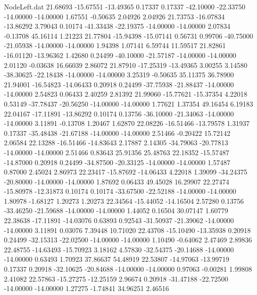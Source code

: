 \begin{filecontents}{NodeLeft.dat}
  21.68693  -15.67551  -13.49365     0.17337    0.17337  -42.10000  -22.33750  -14.00000  -14.00000    1.67551   -0.50635    2.04926    2.04926
  21.73753  -16.07834  -13.86292     3.79043    0.10174  -41.33438  -22.19375  -14.00000  -14.00000    2.07834   -0.13708   45.16114    1.21223
  21.77804  -15.94398  -15.07141     0.56731    0.99706  -40.75000  -21.05938  -14.00000  -14.00000    1.94398    1.07141    6.59744   11.59517
  21.82861  -16.01120  -13.96362     1.42680    0.24499  -40.10000  -21.57187  -14.00000  -14.00000    2.01120   -0.03638   16.66039    2.86072
  21.87910  -17.25319  -13.49365     3.00255    3.14580  -38.30625  -22.18438  -14.00000  -14.00000    3.25319   -0.50635   35.11375   36.78900
  21.94001  -16.54823  -14.06433     0.20918    0.24499  -37.75938  -21.88437  -14.00000  -14.00000    2.54823    0.06433    2.40259    2.81392
  21.99060  -15.77621  -15.37354     4.22018    0.53149  -37.78437  -20.56250  -14.00000  -14.00000    1.77621    1.37354   49.16454    6.19183
  22.04167  -17.11891  -13.86292     0.10174    0.13756  -36.10000  -21.34063  -14.00000  -14.00000    3.11891   -0.13708    1.20467    1.62870
  22.08226  -16.51466  -13.79578     1.31937    0.17337  -35.48438  -21.67188  -14.00000  -14.00000    2.51466   -0.20422   15.72142    2.06584
  22.13288  -16.51466  -14.83643     2.17887    2.14305  -34.79063  -20.77813  -14.00000  -14.00000    2.51466    0.83643   25.91356   25.48763
  22.18352  -15.57487  -14.87000     0.20918    0.24499  -34.87500  -20.33125  -14.00000  -14.00000    1.57487    0.87000    2.45024    2.86973
  22.23417  -15.87692  -14.06433     4.22018    1.39099  -34.24375  -20.80000  -14.00000  -14.00000    1.87692    0.06433   49.45028   16.29907
  22.27474  -15.80978  -12.31873     0.10174    0.10174  -33.67500  -22.52188  -14.00000  -14.00000    1.80978   -1.68127    1.20273    1.20273
  22.34564  -15.44052  -14.16504     2.57280    0.13756  -33.46250  -21.59688  -14.00000  -14.00000    1.44052    0.16504   30.07147    1.60779
  22.38638  -17.11891  -14.03076     0.63893    0.92543  -31.50937  -21.39062  -14.00000  -14.00000    3.11891    0.03076    7.39448   10.71020
  22.43708  -15.10490  -13.35938     0.20918    0.24499  -32.15313  -22.02500  -14.00000  -14.00000    1.10490   -0.64062    2.47469    2.89836
  22.48755  -14.63493  -15.70923     3.18162    4.57830  -32.54375  -20.14688  -14.00000  -14.00000    0.63493    1.70923   37.86637   54.48919
  22.53807  -14.97063  -13.99719     0.17337    0.20918  -32.10625  -20.84688  -14.00000  -14.00000    0.97063   -0.00281    1.99808    2.41082
  22.57863  -15.27275  -12.25159     2.96674    0.20918  -31.47188  -22.72500  -14.00000  -14.00000    1.27275   -1.74841   34.96251    2.46516

\end{filecontents}
